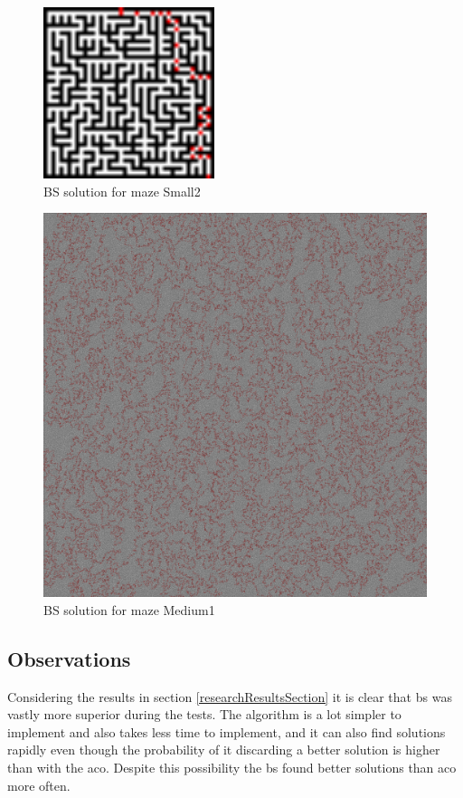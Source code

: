 \documentclass[hidelinks,english,conference]{IEEEtran}
\begin{document}
    \begin{figure}
    \centering
    \includegraphics[width=5cm]{Small2_Solution_BS.png}
    \caption{BS solution for maze Small2}
    \label{bsSmall2SolutionImage}
    \end{figure}
  	
    \begin{figure}
    \centering
    \includegraphics[width=\linewidth]{Medium1_Solution_BS.png}
    \caption{BS solution for maze Medium1}
    \label{bsMedium1SolutionImage}
    \end{figure}
    
    \subsection{Observations}
	Considering the results in section \ref{researchResultsSection} it is clear that \gls{bs} was vastly more superior during the tests. The algorithm is a lot simpler to implement and also takes less time to implement, and it can also find solutions rapidly even though the probability of it discarding  a better solution is higher than with the \gls{aco}. Despite this possibility the \gls{bs} found better solutions than \gls{aco} more often.\\
    
\end{document}
